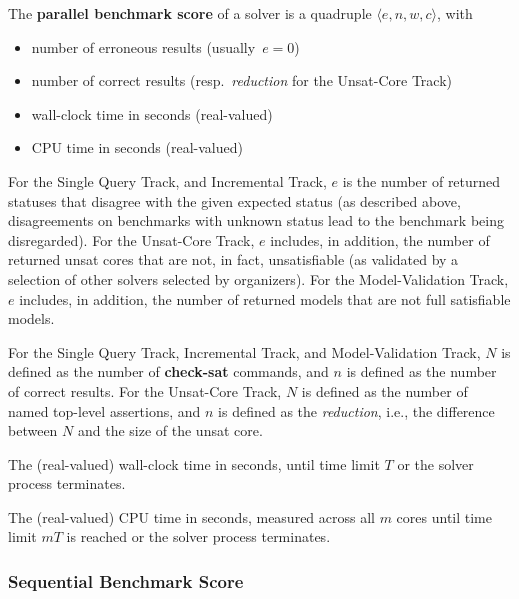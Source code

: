 \documentclass[12pt]{article}
\newcommand{\akey}[1]{\textbf{#1}\xspace}
\newcommand{\maintrack}{Single Query Track\xspace}
\newcommand{\inctrack}{Incremental Track\xspace}
\newcommand{\ucoretrack}{Unsat-Core Track\xspace}
\newcommand{\mvaltrack}{Model-Validation Track\xspace}
\newcommand{\challtrack}{Industry-Challenge Track\xspace}
\begin{document}
The \textbf{parallel benchmark score} of a solver is a quadruple $\langle
e, n, w, c\rangle$, with
\begin{itemize}[noitemsep]
  \vspace{-1ex}
  \item {}
    number of erroneous results (usually~$e = 0$)
  \item {}
    number of correct results (resp.~\emph{reduction} for the \ucoretrack)
  \item {}
    wall-clock time in seconds (real-valued)
  \item {}
    CPU time in seconds (real-valued)
\end{itemize}

For the \maintrack, and \inctrack,%
$e$ is the number of returned
statuses that disagree with the given expected status (as described above,
disagreements on benchmarks with unknown status lead to the benchmark being
disregarded). For the \ucoretrack, $e$ includes, in addition, the number of
returned unsat cores that are not, in fact, unsatisfiable (as
validated by a selection of other solvers selected by organizers).  For the
\mvaltrack, $e$ includes, in addition, the number of returned models that are
not full satisfiable models.

For the \maintrack, \inctrack, and \mvaltrack,
$N$ is defined as the number of \akey{check-sat} commands, and
$n$ is defined as the number of correct results.
For the \ucoretrack, $N$ is defined as the number of named top-level assertions,
and $n$ is defined as the \emph{reduction}, i.e., the difference between $N$
and the size of the unsat core.

The (real-valued) wall-clock time in seconds, until time limit $T$ or the
solver process terminates.

The (real-valued) CPU time in seconds, measured across all $m$ cores
until time limit $mT$ is reached or the solver process
terminates.

\subsubsection{Sequential Benchmark Score}
\label{sec:sequential}
\end{document}
